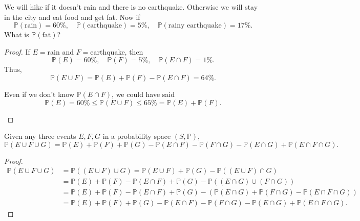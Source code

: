 \begin{eg}
    We will hike if it doesn't rain and there is no earthquake. Otherwise we will stay in the city and eat food and get fat. Now if 
    \[
        \mathbb{P} (\text{rain} ) = 60\%, \quad \mathbb{P} (\text{earthquake})=5\%, \quad \mathbb{P} (\text{rainy earthquake} ) = 17\%.
    \]
    What is \(\mathbb{P} (\text{fat} )\)? 
\end{eg}
\begin{proof}
    If \(E=\)rain and \(F=\)earthquake, then 
    \[
        \mathbb{P} (E) = 60 \%, \quad \mathbb{P} (F) = 5 \%, \quad \mathbb{P} (E \cap F) = 1\%.
    \]  
    Thus, 
    \[
        \mathbb{P} (E \cup F) = \mathbb{P} (E) + \mathbb{P} (F) - \mathbb{P} (E \cap F) = 64 \%.
    \]
    \begin{remark}
        Even if we don't know \(\mathbb{P} (E \cap F)\), we could have said 
        \[
             \mathbb{P} (E) = 60 \% \le \mathbb{P} (E \cup F) \le 65 \% = \mathbb{P} (E) + \mathbb{P} (F).
        \] 
    \end{remark}
\end{proof}

\begin{proposition}
    Given any three events \(E, F, G\) in a probability space \((S, \mathbb{P} )\), 
    \[
        \mathbb{P} (E \cup F \cup G) = \mathbb{P} (E) + \mathbb{P} (F) + \mathbb{P} (G) - \mathbb{P} (E \cap F) - \mathbb{P} (F \cap G) - \mathbb{P} (E \cap G) + \mathbb{P} (E \cap F \cap G).
    \]   
\end{proposition}

\begin{proof}
    \begin{align*}
        \mathbb{P} (E \cup F \cup G) &= \mathbb{P} ((E \cup F) \cup G) = \mathbb{P} (E \cup F) + \mathbb{P} (G) - \mathbb{P} ((E \cup F) \cap G) \\
        &= \mathbb{P} (E) + \mathbb{P} (F) - \mathbb{P} (E \cap F) + \mathbb{P} (G) - \mathbb{P} ((E \cap G) \cup (F \cap G)) \\
        &= \mathbb{P} (E) + \mathbb{P} (F) - \mathbb{P} (E \cap F) + \mathbb{P} (G) - \left( \mathbb{P} (E \cap G) + \mathbb{P} (F \cap G) - \mathbb{P} (E \cap F \cap G)  \right) \\
        &= \mathbb{P} (E) + \mathbb{P} (F) + \mathbb{P} (G) - \mathbb{P} (E \cap F) - \mathbb{P} (F \cap G) - \mathbb{P} (E \cap G) + \mathbb{P} (E \cap F \cap G). 
    \end{align*}
\end{proof}

